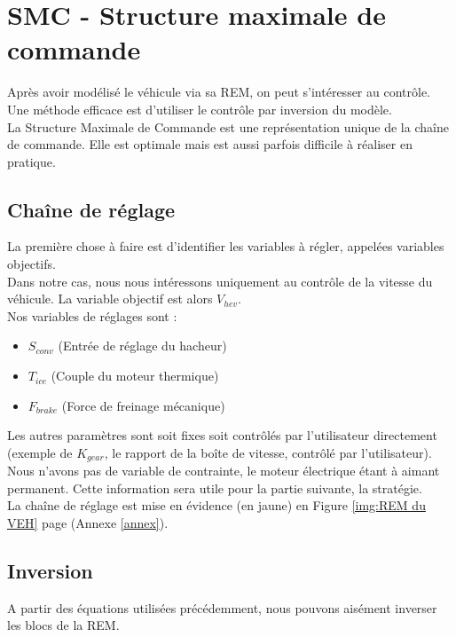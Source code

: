 \section{SMC - Structure maximale de commande}
Après avoir modélisé le véhicule via sa REM, on peut s'intéresser au contrôle. Une méthode efficace est d'utiliser le contrôle par inversion du modèle.\\
La Structure Maximale de Commande est une représentation unique de la chaîne de commande. Elle est optimale mais est aussi parfois difficile à réaliser en pratique.\\
\subsection{Chaîne de réglage}
La première chose à faire est d'identifier les variables à régler, appelées variables objectifs.\\
Dans notre cas, nous nous intéressons uniquement au contrôle de la vitesse du véhicule. La variable objectif est alors $V_{hev}$.\\

Nos variables de réglages sont : 
\begin{itemize}
\item $S_{conv}$ (Entrée de réglage du hacheur)
\item $T_{ice}$ (Couple du moteur thermique)
\item $F_{brake}$ (Force de freinage mécanique)
\end{itemize}

Les autres paramètres sont soit fixes soit contrôlés par l'utilisateur directement (exemple de $K_{gear}$, le rapport de la boîte de vitesse, contrôlé par l'utilisateur).\\

Nous n'avons pas de variable de contrainte, le moteur électrique étant à aimant permanent. Cette information sera utile pour la partie suivante, la stratégie.\\

La chaîne de réglage est mise en évidence (en jaune) en Figure \ref{img:REM du VEH} page \pageref{img:REM du VEH} (Annexe \ref{annex}).\\

\subsection{Inversion}
A partir des équations utilisées précédemment, nous pouvons aisément inverser les blocs de la REM.\\


